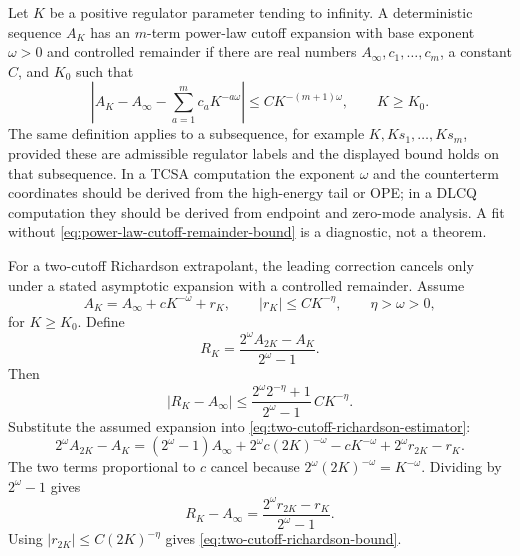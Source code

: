 \begin{definition}
\label{def:power-law-cutoff-expansion}
Let \(K\) be a positive regulator parameter tending to infinity.  A
deterministic sequence \(A_K\) has an \(m\)-term power-law cutoff expansion
with base exponent \(\omega>0\) and controlled remainder if there are real
numbers \(A_\infty,c_1,\ldots,c_m\), a constant \(C\), and \(K_0\) such that
\begin{equation}
  \left|
    A_K
    -
    A_\infty
    -
    \sum_{a=1}^m c_a K^{-a\omega}
  \right|
  \le
  C K^{-(m+1)\omega},
  \qquad K\ge K_0 .
  \label{eq:power-law-cutoff-remainder-bound}
\end{equation}
The same definition applies to a subsequence, for example
\(K,Ks_1,\ldots,Ks_m\), provided these are admissible regulator labels and
the displayed bound holds on that subsequence.  In a TCSA computation the
exponent \(\omega\) and the counterterm coordinates should be derived from
the high-energy tail or OPE; in a DLCQ computation they should be derived
from endpoint and zero-mode analysis.  A fit without
\eqref{eq:power-law-cutoff-remainder-bound} is a diagnostic, not a theorem.
\end{definition}

For a two-cutoff Richardson extrapolant, the leading correction cancels only
under a stated asymptotic expansion with a controlled remainder.  Assume
\[
  A_K=A_\infty+cK^{-\omega}+r_K,
  \qquad
  |r_K|\le C K^{-\eta},
  \qquad
  \eta>\omega>0 ,
\]
for \(K\ge K_0\).  Define
\begin{equation}
  R_K
  =
  \frac{2^\omega A_{2K}-A_K}{2^\omega-1}.
  \label{eq:two-cutoff-richardson-estimator}
\end{equation}
Then
\begin{equation}
  |R_K-A_\infty|
  \le
  \frac{2^\omega 2^{-\eta}+1}{2^\omega-1}\,
  C K^{-\eta}.
  \label{eq:two-cutoff-richardson-bound}
\end{equation}
Substitute the assumed expansion into
\eqref{eq:two-cutoff-richardson-estimator}:
\[
  2^\omega A_{2K}-A_K
  =
  (2^\omega-1)A_\infty
  +
  2^\omega c(2K)^{-\omega}
  -
  cK^{-\omega}
  +
  2^\omega r_{2K}-r_K .
\]
The two terms proportional to \(c\) cancel because
\(2^\omega(2K)^{-\omega}=K^{-\omega}\).  Dividing by \(2^\omega-1\) gives
\[
  R_K-A_\infty
  =
  \frac{2^\omega r_{2K}-r_K}{2^\omega-1}.
\]
Using \(|r_{2K}|\le C(2K)^{-\eta}\) gives
\eqref{eq:two-cutoff-richardson-bound}.


